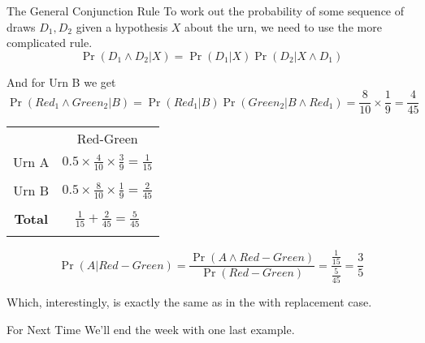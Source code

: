 \documentclass[
  ignorenonframetext,
]{beamer}
\renewcommand{\,}{\text{, }}
\begin{document}
\begin{frame}{The General Conjunction Rule}
\protect\hypertarget{the-general-conjunction-rule-1}{}
To work out the probability of some sequence of draws \(D_1, D_2\) given
a hypothesis \(X\) about the urn, we need to use the more complicated
rule. \[
\Pr(D_1 \wedge D_2 | X) = \Pr(D_1 | X) \Pr(D_2 | X \wedge D_1)
\]

And for Urn B we get \[
\Pr(Red_1 \wedge Green_2 | B) = \Pr(Red_1 | B)\Pr(Green_2 | B \wedge Red_1) = \frac{8}{10} \times \frac{1}{9} = \frac{4}{45}
\]
\end{frame}

\begin{frame}
\begin{longtable}[]{@{}cc@{}}
\toprule
& Red-Green \\ \addlinespace
\midrule
\endhead
Urn A &
\(0.5 \times \frac{4}{10} \times \frac{3}{9} = \frac{1}{15}\) \\ \addlinespace
& \\ \addlinespace
Urn B &
\(0.5 \times \frac{8}{10} \times \frac{1}{9} = \frac{2}{45}\) \\ \addlinespace
& \\ \addlinespace
\textbf{Total} &
\(\frac{1}{15} + \frac{2}{45} = \frac{5}{45}\) \\ \addlinespace
\bottomrule
\end{longtable}

\pause

\[
\Pr(A | Red-Green) = \frac{\Pr(A \wedge Red-Green)}{\Pr(Red-Green)} = \frac{\frac{1}{15}}{\frac{5}{45}} = \frac{3}{5}
\]

\bigskip

Which, interestingly, is exactly the same as in the with replacement
case.
\end{frame}

\begin{frame}{For Next Time}
\protect\hypertarget{for-next-time}{}
We'll end the week with one last example.
\end{frame}
\end{document}
